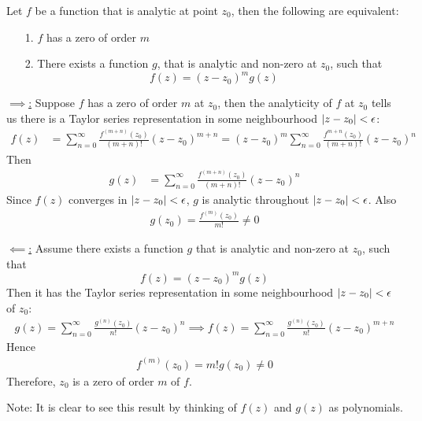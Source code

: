 \documentclass[12pt, english]{book}
\makeatletter
\renewenvironment{proof}[1][\proofname]{\par
	\pushQED{\qed}%
	\normalfont \topsep6\p@\@plus6\p@\relax
	\list{}{%
		\settowidth{\leftmargin}{\itshape\proofname:\hskip\labelsep}%
		\setlength{\labelwidth}{0pt}%
		\setlength{\itemindent}{-\leftmargin}%
		}%
	\item[\hskip\labelsep\itshape#1\@addpunct{:}]\ignorespaces
	}{\popQED\endlist\@endpefalse}
\makeatother
\begin{document}
	\begin{theorem}
		\label{Zero of order m iff zero can be factored Theorem - Complex}
		Let \(f\) be a function that is analytic at point \(z_0\), then the following are equivalent:
		\begin{itemize}
			\item[1.] \(f\) has a zero of order \(m\)
			\item[2.] There exists a function \(g\), that is analytic and non-zero at \(z_0\), such that 
			\[f(z) = (z-z_0)^m g(z)\]
		\end{itemize}
	\end{theorem}
	\begin{proof}
		\underline{\(\implies\):} \newline
		Suppose \(f\) has a zero of order \(m\) at \(z_0\), then the analyticity of \(f\) at \(z_0\) tells us there is a Taylor series representation in some neighbourhood \(\abs{z-z_0}<\epsilon\):
		\begin{align*}
			f(z) &= \sum_{n=0}^{\infty} \frac{f^{(m+n)}(z_0)}{(m+n)!} (z-z_0)^{m+n} = (z-z_0)^m \sum_{n=0}^{\infty} \frac{f^{m+n}(z_0)}{(m+n)!}(z-z_0)^n
		\end{align*}
		Then 
		\begin{align*}
			g(z) &= \sum_{n=0}^{\infty} \frac{f^{(m+n)}(z_0)}{(m+n)!} (z-z_0)^n
		\end{align*}
		Since \(f(z)\) converges in \(\abs{z-z_0}<\epsilon\), \(g\) is analytic throughout \(\abs{z-z_0}<\epsilon\). Also
		\begin{align*}
			g(z_0) = \frac{f^{(m)}(z_0)}{m!} \neq 0
		\end{align*}
		
		\underline{\(\impliedby\):} \newline
		Assume there exists a function \(g\) that is analytic and non-zero at \(z_0\), such that 
		\[f(z) = (z-z_0)^m g(z)\]
		Then it has the Taylor series representation in some neighbourhood \(\abs{z-z_0}<\epsilon\) of \(z_0\):
		\begin{align*}
			g(z) = \sum_{n=0}^{\infty} \frac{g^{(n)}(z_0)}{n!} (z-z_0)^n
			\implies
			f(z) = \sum_{n=0}^{\infty} \frac{g^{(n)}(z_0)}{n!} (z-z_0)^{m+n}
		\end{align*}
		Hence 
		\begin{align*}
			f^{(m)}(z_0) = m! g(z_0) \neq 0
		\end{align*}
		Therefore, \(z_0\) is a zero of order \(m\) of \(f\).
	\end{proof}
	
	Note: It is clear to see this result by thinking of \(f(z)\) and \(g(z)\) as polynomials.
	
\end{document}
